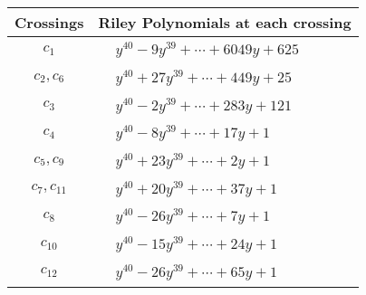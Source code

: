 \documentclass[1p]{elsarticle_modified}
\theoremstyle{definition}
\begin{document}
\begin{tabular}{m{50pt}|m{274pt}}
Crossings & \hspace{64pt}Riley Polynomials at each crossing \\
\hline $$\begin{aligned}c_{1}\end{aligned}$$&$\begin{aligned}
&y^{40}-9 y^{39}+\cdots+6049 y+625
\end{aligned}$\\
\hline $$\begin{aligned}c_{2},c_{6}\end{aligned}$$&$\begin{aligned}
&y^{40}+27 y^{39}+\cdots+449 y+25
\end{aligned}$\\
\hline $$\begin{aligned}c_{3}\end{aligned}$$&$\begin{aligned}
&y^{40}-2 y^{39}+\cdots+283 y+121
\end{aligned}$\\
\hline $$\begin{aligned}c_{4}\end{aligned}$$&$\begin{aligned}
&y^{40}-8 y^{39}+\cdots+17 y+1
\end{aligned}$\\
\hline $$\begin{aligned}c_{5},c_{9}\end{aligned}$$&$\begin{aligned}
&y^{40}+23 y^{39}+\cdots+2 y+1
\end{aligned}$\\
\hline $$\begin{aligned}c_{7},c_{11}\end{aligned}$$&$\begin{aligned}
&y^{40}+20 y^{39}+\cdots+37 y+1
\end{aligned}$\\
\hline $$\begin{aligned}c_{8}\end{aligned}$$&$\begin{aligned}
&y^{40}-26 y^{39}+\cdots+7 y+1
\end{aligned}$\\
\hline $$\begin{aligned}c_{10}\end{aligned}$$&$\begin{aligned}
&y^{40}-15 y^{39}+\cdots+24 y+1
\end{aligned}$\\
\hline $$\begin{aligned}c_{12}\end{aligned}$$&$\begin{aligned}
&y^{40}-26 y^{39}+\cdots+65 y+1
\end{aligned}$\\
\hline
\end{tabular}\\~\\
\end{document}
